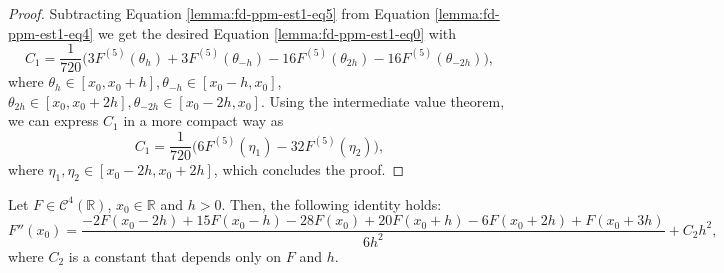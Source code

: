 \begin{proof}
	Subtracting Equation \eqref{lemma:fd-ppm-est1-eq5} from Equation \eqref{lemma:fd-ppm-est1-eq4} we get 
	the desired Equation \eqref{lemma:fd-ppm-est1-eq0} with
	\begin{equation}
		C_1 = \frac{1}{720}\bigg( 3F^{(5)}(\theta_{h}) + 3F^{(5)}(\theta_{-h})
            -16F^{(5)}(\theta_{2h}) - 16F^{(5)}(\theta_{-2h})\bigg), 
	\end{equation}
	where $\theta_{h} \in [x_0,x_0+h], \theta_{-h}\in [x_0-h,x_0]$, 
	$\theta_{2h} \in [x_0,x_0+2h], \theta_{-2h}\in [x_0-2h,x_0]$.
	Using the intermediate value theorem, we can express $C_1$ in a more compact way as
	\begin{equation}
	\label{lemma:fd-ppm-est1-eq6}
	C_1 = \frac{1}{720}\bigg( 6F^{(5)}(\eta_{1}) -32F^{(5)}(\eta_{2})\bigg), 
\end{equation}
where $\eta_{1}, \eta_{2} \in [x_0-2h,x_0+2h]$, which concludes the proof.
\end{proof}


\begin{lema}
	\label{lemma:fd-ppm-est2}
	Let $F \in \mathcal{C}^{4}(\mathbb{R})$, $x_0 \in \mathbb{R}$ and $h>0$.
	Then, the following identity holds:
	\begin{equation}	
		\label{lemma:fd-ppm-est2-eq0}
		F''(x_0) =  \frac{-2F(x_0-2h) + 15F(x_0-h) -28F(x_0) + 20F(x_0+h) -6F(x_0+2h) + F(x_0+3h)}{6h^2}
		      + C_2h^2,
	\end{equation}
	where $C_2$ is a constant that depends only on $F$ and $h$.
\end{lema}

